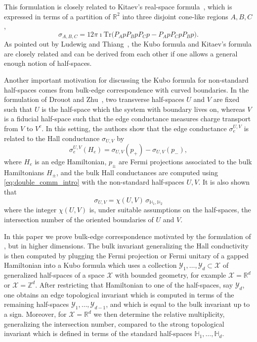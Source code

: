 \documentclass[12pt]{amsart}
\newcommand{\RM}{{\mathbb R}}
\newcommand{\ZM}{{\mathbb Z}}
\newcommand{\HM}{{\mathbb H}}
\newcommand{\Xx}{{\mathcal X}}
\newcommand{\Yy}{{\mathcal Y}}
\begin{document}
This formulation is closely related to Kitaev's real-space formula~\cite{Kitaev06}, which is expressed in terms of a partition of $\mathbb{R}^2$ into three disjoint cone-like regions $A,B,C$,
$$\sigma_{A,B,C} = 12 \pi \imath \mathrm{Tr}\big(P_A p P_B p P_C p -  P_A p P_C p P_B p\big).$$
As pointed out by Ludewig and Thiang~\cite{LudewigThiang25}, the Kubo formula and Kitaev's formula are closely related and can be derived from each other if one allows a general enough notion of half-spaces. 

Another important motivation for discussing the Kubo formula for non-standard half-spaces comes from bulk-edge correspondence with curved boundaries. In the formulation of Drouot and Zhu~\cite{drouot2024bulk}, two transverse half-spaces $U$ and $V$ are fixed such that $U$ is the half-space which the system with boundary lives on, whereas $V$ is a fiducial half-space such that the edge conductance measures charge transport from $V$ to $V^c$. 
In this setting, the authors show that the edge conductance $\sigma_e^{U,V}$ is related to the Hall conductance $\sigma_{U,V}$ by
\[\sigma_e^{U,V}(H_e) = \sigma_{U,V}(p_+) -\sigma_{U,V}(p_-),\]
where $H_e$ is an edge Hamiltonian, $p_{\pm}$ are Fermi projections associated to the bulk Hamiltonians $H_{\pm}$, and the bulk Hall conductances are computed using \eqref{eq:double_comm_intro} with the non-standard half-spaces $U,V$. It is also shown that
\begin{equation}
\label{eq:sigmaUV}
\sigma_{U,V} = \chi(U,V)\, \sigma_{\mathbb{H}_1,\mathbb{H}_2}
\end{equation}
where the integer $\chi(U,V)$ is, under suitable assumptions on the half-spaces, the intersection number of the oriented boundaries of $U$ and $V$. 

In this paper we prove bulk-edge correspondence motivated by the formulation of \cite{drouot2024bulk}, but in higher dimensions. The bulk invariant generalizing the Hall conductivity is then computed by plugging the Fermi projection or Fermi unitary of a gapped Hamiltonian into a Kubo formula which uses a collection $\Yy_1,\ldots,\Yy_d\subset \Xx$ of generalized half-spaces of a space $\Xx$ with bounded geometry, for example $\Xx=\RM^d$ or $\Xx=\ZM^d$. 
After restricting that Hamiltonian to one of the half-spaces, say $\Yy_d$, one obtains an edge topological invariant which is computed in terms of the remaining half-spaces $\Yy_1,\ldots,\Yy_{d-1}$, and which is equal to the bulk invariant up to a sign. Moreover, for $\Xx=\RM^d$ we then determine the relative multiplicity, generalizing the intersection number, compared to the strong topological invariant which is defined in terms of the standard half-spaces $\HM_1,\ldots,\HM_d$.
\end{document}
